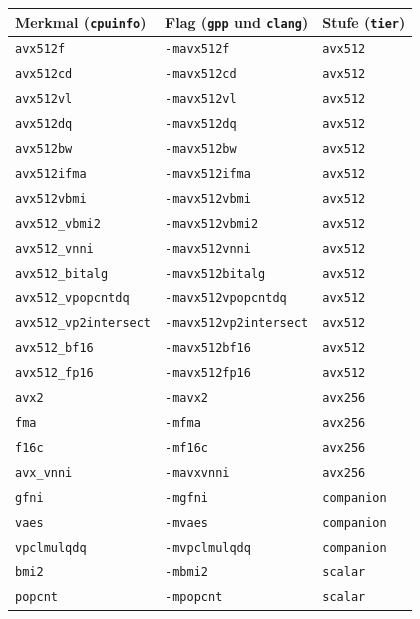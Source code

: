 \begin{scriptsize}
\begin{longtable}{@{}>{\raggedright\arraybackslash}p{4.4cm} >{\raggedright\arraybackslash}p{5.4cm} >{\raggedright\arraybackslash}p{3.7cm}@{}}
\toprule
Merkmal (\texttt{cpuinfo}) & Flag (\texttt{gpp} und \texttt{clang}) & Stufe (\texttt{tier}) \\
\midrule
\endhead%
\texttt{avx512f} & \texttt{-mavx512f} & \texttt{avx512} \\
\texttt{avx512cd} & \texttt{-mavx512cd} & \texttt{avx512} \\
\texttt{avx512vl} & \texttt{-mavx512vl} & \texttt{avx512} \\
\texttt{avx512dq} & \texttt{-mavx512dq} & \texttt{avx512} \\
\texttt{avx512bw} & \texttt{-mavx512bw} & \texttt{avx512} \\
\texttt{avx512ifma} & \texttt{-mavx512ifma} & \texttt{avx512} \\
\texttt{avx512vbmi} & \texttt{-mavx512vbmi} & \texttt{avx512} \\
\texttt{avx512\_\allowbreak{}vbmi2} & \texttt{-mavx512vbmi2} & \texttt{avx512} \\
\texttt{avx512\_\allowbreak{}vnni} & \texttt{-mavx512vnni} & \texttt{avx512} \\
\texttt{avx512\_\allowbreak{}bitalg} & \texttt{-mavx512bitalg} & \texttt{avx512} \\
\texttt{avx512\_\allowbreak{}vpopcntdq} & \texttt{-mavx512vpopcntdq} & \texttt{avx512} \\
\texttt{avx512\_\allowbreak{}vp2intersect} & \texttt{-mavx512vp2intersect} & \texttt{avx512} \\
\texttt{avx512\_\allowbreak{}bf16} & \texttt{-mavx512bf16} & \texttt{avx512} \\
\texttt{avx512\_\allowbreak{}fp16} & \texttt{-mavx512fp16} & \texttt{avx512} \\
\texttt{avx2} & \texttt{-mavx2} & \texttt{avx256} \\
\texttt{fma} & \texttt{-mfma} & \texttt{avx256} \\
\texttt{f16c} & \texttt{-mf16c} & \texttt{avx256} \\
\texttt{avx\_\allowbreak{}vnni} & \texttt{-mavxvnni} & \texttt{avx256} \\
\texttt{gfni} & \texttt{-mgfni} & \texttt{companion} \\
\texttt{vaes} & \texttt{-mvaes} & \texttt{companion} \\
\texttt{vpclmulqdq} & \texttt{-mvpclmulqdq} & \texttt{companion} \\
\texttt{bmi2} & \texttt{-mbmi2} & \texttt{scalar} \\
\texttt{popcnt} & \texttt{-mpopcnt} & \texttt{scalar} \\
\bottomrule
\end{longtable}
\end{scriptsize}

